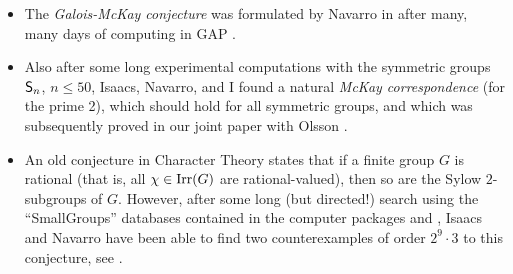 \begin{itemize}
\item The {\it Galois-McKay conjecture} 
was formulated by Navarro in \cite{N} after many, many days of computing in {\sf GAP} \cite{GAP}.

\item Also after some long experimental computations with the symmetric groups ${\sf S}_n$, $n \leq 50$, Isaacs, Navarro, and I found a natural 
{\it McKay correspondence} (for the prime 2), which should hold for all symmetric groups, and which was subsequently 
proved in our joint paper with Olsson \cite{INOT}.

\item An old conjecture in Character Theory states that if a finite group $G$ is rational (that is, all $\chi \in {\mathrm {Irr}}(G)$ are 
rational-valued), then so are the Sylow $2$-subgroups of $G$. However, after some long (but directed!) search using 
the ``SmallGroups'' databases contained in the computer packages \cite{GAP} and \cite{Magma}, 
Isaacs and Navarro have been able to find two counterexamples of order $2^9 \cdot 3$ to this conjecture, see \cite{IN}. 
\end{itemize}
\iffalse
